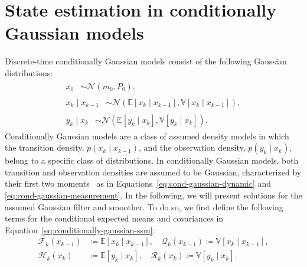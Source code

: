 \documentclass[dissertation,math,vertlayout,pdfa,colorlinks,nologo]{aaltoseries}
\begin{document}
\section{State estimation in conditionally Gaussian models} \label{sec:conditionally-gaussian-model}
Discrete-time conditionally Gaussian models consist of the following Gaussian distributions:
\begin{subequations} \label{eq:conditionally-gaussian-ssm}
    \begin{align}
        \begin{split} \label{eq:cond-gaussian-x0}
            x_0 &\sim \mathcal{N}(m_0, P_0),
        \end{split}\\
        \begin{split} \label{eq:cond-gaussian-dynamic}
            x_k \mid x_{k - 1} &\sim \mathcal{N}(\mathbb{E}[x_k \mid x_{k - 1}] , \mathbb{V}[x_k \mid x_{k-1}]), 
        \end{split}\\
        \begin{split} \label{eq:cond-gaussian-measurement}
            y_k \mid x_k &\sim \mathcal{N}(\mathbb{E}[y_k \mid x_k],  \mathbb{V}[y_k \mid x_k]).
        \end{split}
    \end{align}
\end{subequations}
Conditionally Gaussian models are a class of assumed density models in which the transition density, $p(x_k \mid x_{k-1})$, and the observation density, $p(y_k \mid x_k)$, belong to a specific class of distributions. In conditionally Gaussian models, both transition and observation densities are assumed to be Gaussian, characterized by their first two moments~\citep{maybeck1982stochastic, arasaratnam2009cubature, sarkka2008unscented} as in Equations~\eqref{eq:cond-gaussian-dynamic} and \eqref{eq:cond-gaussian-measurement}. In the following, we will present solutions for the assumed Gaussian filter and smoother. To do so, we first define the following terms for the conditional expected means and covariances in Equation~\eqref{eq:conditionally-gaussian-ssm}:
\begin{equation} \label{eq:con-gau-params}
    \begin{split}
        \mathcal{F}_k(x_{k-1}) &\coloneq \mathbb{E}[x_k \mid x_{k - 1}], \quad \mathcal{Q}_k(x_{k-1}) \coloneq \mathbb{V}[x_k \mid x_{k - 1}], \\
        \mathcal{H}_k(x_{k}) &\coloneq \mathbb{E}[y_k \mid x_{k}], \quad \mathcal{R}_k(x_{k}) \coloneq \mathbb{V}[y_k \mid x_{k}].
    \end{split}
\end{equation}
\end{document}
